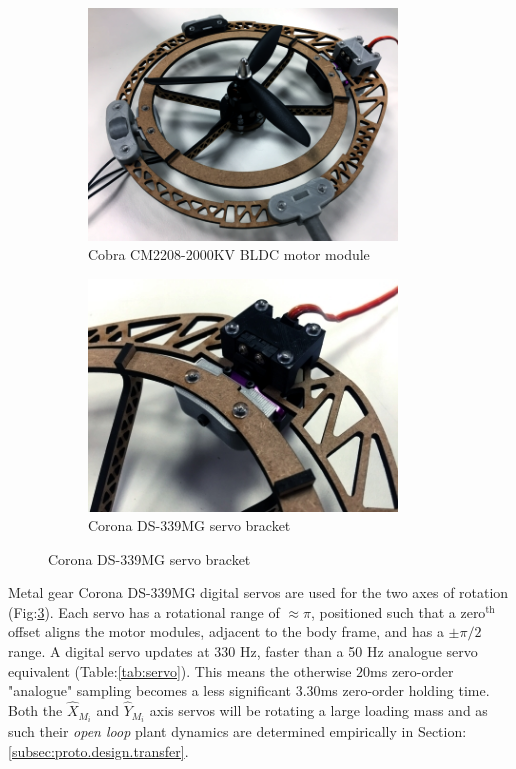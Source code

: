 \begin{figure}[htbp]
\centering
\begin{subfigure}{0.49\textwidth}
\centering
\includegraphics[width=0.9\textwidth]{figs/motor-bldc}
\caption{Cobra CM2208-2000KV BLDC motor module}
\label{fig:bldc-motor}
\end{subfigure}
\begin{subfigure}{0.49\textwidth}
\centering
\includegraphics[width=0.9\textwidth]{figs/motor-servo}
\caption{Corona DS-339MG servo bracket}
\label{fig:motor-servo}
\end{subfigure}
\end{figure}
\par
Metal gear Corona DS-339MG digital servos are used for the two axes of rotation (Fig:\ref{fig:motor-servo}). Each servo has a rotational range of $\approx\pi$, positioned such that a $\text{zero}^{\text{th}}$ offset aligns the motor modules, adjacent to the body frame, and has a $\pm\pi/2$ range. A digital servo updates at 330 Hz, faster than a 50 Hz analogue servo equivalent (Table:\ref{tab:servo}). This means the otherwise $20$ms zero-order "analogue" sampling becomes a less significant $3.30$ms zero-order holding time. Both the $\hat{X}_{M_i}$ and $\hat{Y}_{M_i}$ axis servos will be rotating a large loading mass and as such their \emph{open loop} plant dynamics are determined empirically in Section:\ref{subsec:proto.design.transfer}.
